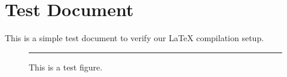 \documentclass{article}
\begin{document}
\section{Test Document}
This is a simple test document to verify our LaTeX compilation setup.

\begin{figure}
\centering
\rule{5cm}{3cm} %
\caption{This is a test figure.}
\label{fig:test}
\end{figure}
\end{document}

